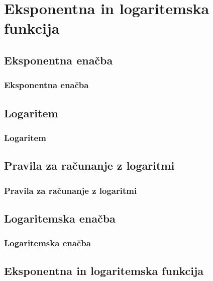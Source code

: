 \section{Eksponentna in logaritemska funkcija}

\begin{frame}
    \sectionpage
\end{frame}

\begin{frame}
\end{frame}

    \subsection{Eksponentna enačba}

        \begin{frame}
            \frametitle{Eksponentna enačba}
        \end{frame}

    \subsection{Logaritem}

        \begin{frame}
            \frametitle{Logaritem}
        \end{frame}

    \subsection{Pravila za računanje z logaritmi}

        \begin{frame}
            \frametitle{Pravila za računanje z logaritmi}
        \end{frame}

    \subsection{Logaritemska enačba}

        \begin{frame}
            \frametitle{Logaritemska enačba}
        \end{frame}

    \subsection{Eksponentna in logaritemska funkcija}

